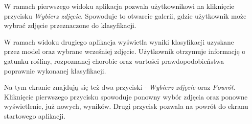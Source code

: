 W ramach pierwszego widoku aplikacja pozwala użytkownikowi na kliknięcie przycisku \textit{Wybierz zdjęcie}. Spowoduje to otwarcie galerii, gdzie użytkownik może wybrać zdjęcie przeznaczone do klasyfikacji.


W ramach widoku drugiego aplikacja wyświetla wyniki klasyfikacji uzyskane przez model oraz wybrane wcześniej zdjęcie. Użytkownik otrzymuje informację o gatunku rośliny, rozpoznanej chorobie oraz wartości prawdopodobieństwa poprawnie wykonanej klasyfikacji.

 Na tym ekranie znajdują się też dwa przyciski - \textit{Wybierz zdjęcie} oraz \textit{Powrót}. Kliknięcie pierwszego przycisku spowoduje ponowny wybór zdjęcia oraz ponowne wyświetlenie, już nowych, wyników. Drugi przycisk pozwala na powrót do ekranu startowego aplikacji.



